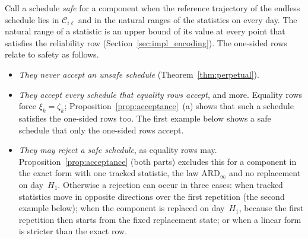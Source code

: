 \documentclass[11pt,a4paper]{article}
\theoremstyle{plain}
\theoremstyle{definition}
\theoremstyle{remark}
\begin{document}
Call a schedule \emph{safe} for a component when the reference trajectory of the endless schedule lies in $\mathcal{C}_{i\ell}$ and in the natural ranges of the statistics on every day.
The natural range of a statistic is an upper bound of its value at every point that satisfies the reliability row (Section~\ref{sec:impl_encoding}).
The one-sided rows relate to safety as follows.
\begin{itemize}[nosep]
  \item \emph{They never accept an unsafe schedule} (Theorem~\ref{thm:perpetual}).
  \item \emph{They accept every schedule that equality rows accept}, and more.
    Equality rows force $\xi_k = \zeta_k$; Proposition~\ref{prop:acceptance}~(a) shows that such a schedule satisfies the one-sided rows too.
    The first example below shows a safe schedule that only the one-sided rows accept.
  \item \emph{They may reject a safe schedule}, as equality rows may.
    Proposition~\ref{prop:acceptance} (both parts) excludes this for a component in the exact form with one tracked statistic, the law $\text{ARD}_\infty$ and no replacement on day~$H_1$.
    Otherwise a rejection can occur in three cases: when tracked statistics move in opposite directions over the first repetition (the second example below); when the component is replaced on day~$H_1$, because the first repetition then starts from the fixed replacement state; or when a linear form is stricter than the exact row.
\end{itemize}
\end{document}
